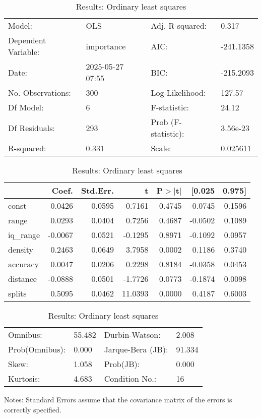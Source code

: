 \begin{table}
\caption{Results: Ordinary least squares}
\label{}
\begin{center}
\begin{tabular}{llll}
\hline
Model:              & OLS              & Adj. R-squared:     & 0.317      \\
Dependent Variable: & importance       & AIC:                & -241.1358  \\
Date:               & 2025-05-27 07:55 & BIC:                & -215.2093  \\
No. Observations:   & 300              & Log-Likelihood:     & 127.57     \\
Df Model:           & 6                & F-statistic:        & 24.12      \\
Df Residuals:       & 293              & Prob (F-statistic): & 3.56e-23   \\
R-squared:          & 0.331            & Scale:              & 0.025611   \\
\hline
\end{tabular}
\end{center}

\begin{center}
\begin{tabular}{lrrrrrr}
\hline
          &   Coef. & Std.Err. &       t & P$> |$t$|$ &  [0.025 & 0.975]  \\
\hline
const     &  0.0426 &   0.0595 &  0.7161 &      0.4745 & -0.0745 & 0.1596  \\
range     &  0.0293 &   0.0404 &  0.7256 &      0.4687 & -0.0502 & 0.1089  \\
iq\_range & -0.0067 &   0.0521 & -0.1295 &      0.8971 & -0.1092 & 0.0957  \\
density   &  0.2463 &   0.0649 &  3.7958 &      0.0002 &  0.1186 & 0.3740  \\
accuracy  &  0.0047 &   0.0206 &  0.2298 &      0.8184 & -0.0358 & 0.0453  \\
distance  & -0.0888 &   0.0501 & -1.7726 &      0.0773 & -0.1874 & 0.0098  \\
splits    &  0.5095 &   0.0462 & 11.0393 &      0.0000 &  0.4187 & 0.6003  \\
\hline
\end{tabular}
\end{center}

\begin{center}
\begin{tabular}{llll}
\hline
Omnibus:       & 55.482 & Durbin-Watson:    & 2.008   \\
Prob(Omnibus): & 0.000  & Jarque-Bera (JB): & 91.334  \\
Skew:          & 1.058  & Prob(JB):         & 0.000   \\
Kurtosis:      & 4.683  & Condition No.:    & 16      \\
\hline
\end{tabular}
\end{center}
\end{table}
\bigskip
Notes: \newline 
[1] Standard Errors assume that the covariance matrix of the errors is correctly specified.